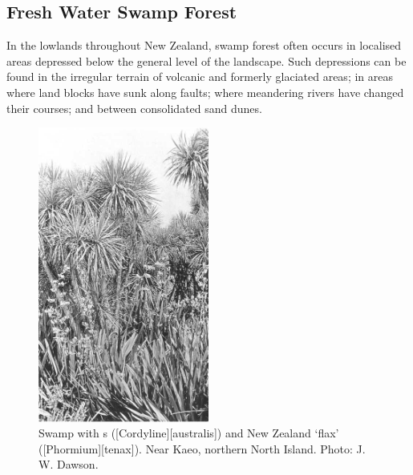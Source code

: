 \subsection{Fresh Water Swamp Forest}

In the lowlands throughout New Zealand, swamp forest often occurs in localised areas depressed below the general level of the landscape.
Such depressions can be found in the irregular terrain of volcanic and formerly glaciated areas; in areas where land blocks have sunk along faults; where meandering rivers have changed their courses; and between consolidated sand dunes.

\begin{figure}
	\includegraphics[width=0.5\textwidth]{graphics/figure66cabbagetree.jpg}
	\centering
	\caption[Swamp with cabbage trees]{Swamp with s ([Cordyline][australis]) and New Zealand `flax' ([Phormium][tenax]). Near Kaeo, northern North Island.
	Photo: J. W. Dawson.}%
	\label{fig:66cabbagetree}
\end{figure}

